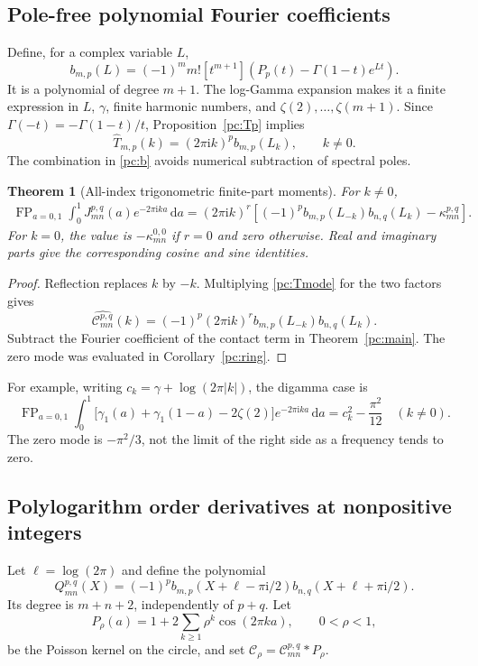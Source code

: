 \documentclass[11pt,a4paper]{article}
\numberwithin{equation}{section}
\newtheorem{theorem}{Theorem}[section]
\theoremstyle{definition}
\newcommand{\ii}{\mathrm i}
\newcommand{\dd}{\,\mathrm d}
\newcommand{\FP}{\operatorname{FP}}
\newcommand{\CC}{\mathcal C}
\begin{document}
\subsection{Pole-free polynomial Fourier coefficients}
Define, for a complex variable $L$,
\begin{equation}\label{pc:b}
b_{m,p}(L)=(-1)^m m![t^{m+1}]
\left(P_p(t)-\Gamma(1-t)e^{Lt}\right).
\end{equation}
It is a polynomial of degree $m+1$. The log-Gamma expansion makes it a finite expression in $L$, $\gamma$, finite harmonic numbers, and $\zeta(2),\ldots,\zeta(m+1)$. Since $\Gamma(-t)=-\Gamma(1-t)/t$, Proposition~\ref{pc:Tp} implies
\begin{equation}\label{pc:Tmode}
\widehat T_{m,p}(k)=(2\pi\ii k)^p b_{m,p}(L_k),\qquad k\ne0.
\end{equation}
The combination in \eqref{pc:b} avoids numerical subtraction of spectral poles.

\begin{theorem}[All-index trigonometric finite-part moments]\label{pc:fourier}
For $k\ne0$,
\begin{align}
\FP_{a=0,1}\int_0^1J_{mn}^{p,q}(a)e^{-2\pi\ii ka}\dd a
=(2\pi\ii k)^r\left[
(-1)^p b_{m,p}(L_{-k})b_{n,q}(L_k)-\kappa_{mn}^{p,q}
\right].\label{pc:mode-identity}
\end{align}
For $k=0$, the value is $-\kappa_{mn}^{0,0}$ if $r=0$ and zero otherwise. Real and imaginary parts give the corresponding cosine and sine identities.
\end{theorem}
\begin{proof}
Reflection replaces $k$ by $-k$. Multiplying \eqref{pc:Tmode} for the two factors gives
\[
\widehat{\CC_{mn}^{p,q}}(k)=(-1)^p(2\pi\ii k)^r
b_{m,p}(L_{-k})b_{n,q}(L_k).
\]
Subtract the Fourier coefficient of the contact term in Theorem~\ref{pc:main}. The zero mode was evaluated in Corollary~\ref{pc:ring}.
\end{proof}
For example, writing $c_k=\gamma+\log(2\pi|k|)$, the digamma case is
\begin{equation}\label{pc:base-mode}
\FP_{a=0,1}\int_0^1
\big[\gamma_1(a)+\gamma_1(1-a)-2\zeta(2)\big]e^{-2\pi\ii ka}\dd a
=c_k^2-\frac{\pi^2}{12}\quad(k\ne0).
\end{equation}
The zero mode is $-\pi^2/3$, not the limit of the right side as a frequency tends to zero.

\subsection{Polylogarithm order derivatives at nonpositive integers}
Let $\ell=\log(2\pi)$ and define the polynomial
\begin{equation}\label{pc:Qpoly}
Q_{mn}^{p,q}(X)=(-1)^p
b_{m,p}(X+\ell-\pi\ii/2)
 b_{n,q}(X+\ell+\pi\ii/2).
\end{equation}
Its degree is $m+n+2$, independently of $p+q$. Let
\[
P_\rho(a)=1+2\sum_{k\ge1}\rho^k\cos(2\pi ka),\qquad 0<\rho<1,
\]
be the Poisson kernel on the circle, and set $\CC_\rho=\CC_{mn}^{p,q}*P_\rho$.
\end{document}
